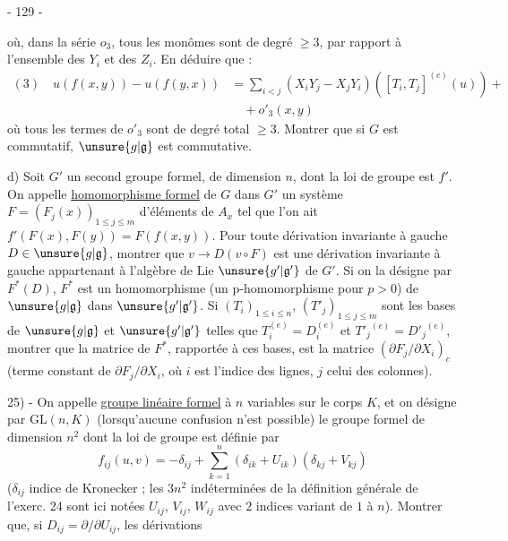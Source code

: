 \begin{center}- 129 -\end{center}

où, dans la série $o_3$, tous les monômes sont de degré $\geq3$, par rapport à l'ensemble des $Y_i$ et des $Z_i$. En déduire que :
\[
\begin{aligned}
(3)\quad u(f(x,y))-u(f(y,x))&=\sum_{i<j}(X_iY_j-X_jY_i)([T_i,T_j]^{(e)}(u))+\\
&\quad+o'_3(x,y)
\end{aligned}
\]
où tous les termes de $o'_3$ sont de degré total $\geq3$. Montrer que si $G$ est commutatif, $\unsure{g|\mathfrak g}$ est commutative.

d) Soit $G'$ un second groupe formel, de dimension $n$, dont la loi de groupe est $f'$. On appelle \uline{homomorphisme formel} de $G$ dans $G'$ un système $F=(F_j(x))_{1\leq j\leq m}$ d'éléments de $A_x$ tel que l'on ait $f'(F(x),F(y))=F(f(x,y))$. Pour toute dérivation invariante à gauche $D\in\unsure{g|\mathfrak g}$, montrer que $v\longrightarrow D(v\circ F)$ est une dérivation invariante à gauche appartenant à l'algèbre de Lie $\unsure{g'|\mathfrak g'}$ de $G'$. Si on la désigne par $F^*(D)$, $F^*$ est un homomorphisme (un p-homomorphisme pour $p>0$) de $\unsure{g|\mathfrak g}$ dans $\unsure{g'|\mathfrak g'}$. Si $(T_i)_{1\leq i\leq n}$, $(T'_j)_{1\leq j\leq m}$ sont les bases de $\unsure{g|\mathfrak g}$ et $\unsure{g'|\mathfrak g'}$ telles que $T_i^{(e)}=D_i^{(e)}$ et ${T'_j}^{(e)}={D'_j}^{(e)}$, montrer que la matrice de $F^*$, rapportée à ces bases, est la matrice $(\partial F_j/\partial X_i)_c$ (terme constant de $\partial F_j/\partial X_i$, où $i$ est l'indice des lignes, $j$ celui des colonnes).

25) - On appelle \uline{groupe linéaire formel} à $n$ variables sur le corps $K$, et on désigne par $\mathrm{GL}(n,K)$ (lorsqu'aucune confusion n'est possible) le groupe formel de dimension $n^2$ dont la loi de groupe est définie par
\[
f_{ij}(u,v)=-\delta_{ij}+\sum_{k=1}^n(\delta_{ik}+U_{ik})(\delta_{kj}+V_{kj})
\]
($\delta_{ij}$ indice de Kronecker ; les $3n^2$ indéterminées de la définition générale de l'exerc. 24 sont ici notées $U_{ij}$, $V_{ij}$, $W_{ij}$ avec $2$ indices variant de $1$ à $n$). Montrer que, si $D_{ij}=\partial/\partial U_{ij}$, les dérivations
